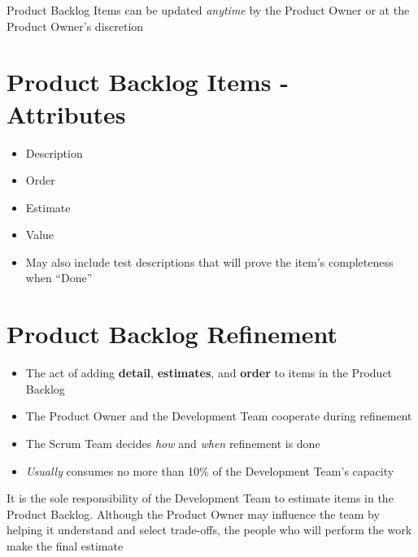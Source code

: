 \documentclass[a4paper,11pt,twocolumn]{article}
\begin{document}
\begin{tcolorbox}[colback=black!8!white,colframe=gray!50!black,title=Note,sharp corners,fonttitle=\normalsize\bfseries,fontupper=\normalsize,left=0.7em,right=0.7em]
	Product Backlog Items can be updated \textit{anytime} by the Product Owner or at the Product Owner's discretion
\end{tcolorbox}

\section*{Product Backlog Items - Attributes}
\begin{itemize}
	\item Description
    \item Order
    \item Estimate
    \item Value
    \item May also include test descriptions that will prove the item's completeness when ``Done''
\end{itemize}

\section*{Product Backlog Refinement}
\begin{itemize}
	\item The act of adding \textbf{detail}, \textbf{estimates}, and \textbf{order} to items in the Product Backlog
	\item The Product Owner and the Development Team cooperate during refinement
	\item The Scrum Team decides \textit{how} and \textit{when} refinement is done
	\item \textit{Usually} consumes no more than 10\% of the Development Team's capacity
\end{itemize}

\begin{tcolorbox}[colback=black!8!white,colframe=gray!50!black,title=Note,sharp corners,fonttitle=\normalsize\bfseries,fontupper=\normalsize,left=0.7em,right=0.7em]
	It is the sole responsibility of the Development Team to estimate items in the Product Backlog. Although the Product Owner may influence the team by helping it understand and select trade-offs, the people who will perform the work make the final estimate
\end{tcolorbox}
\end{document}
